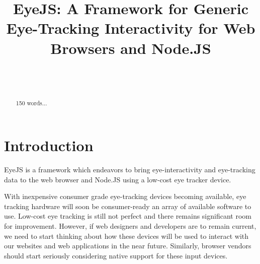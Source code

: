 \documentclass{sigchi}
\begin{document}
\title{EyeJS: A Framework for Generic Eye-Tracking Interactivity for Web Browsers and Node.JS}

\author{%
  \\
  \\
}

\maketitle



\begin{abstract}
  150 words...
\end{abstract}









\section{Introduction}
EyeJS is a framework which endeavors to bring eye-interactivity and
eye-tracking data to the web browser and Node.JS using a low-cost eye
tracker device. 

With inexpensive consumer grade eye-tracking devices becoming available, 
eye tracking hardware will soon be consumer-ready an array of available 
software to use. Low-cost eye tracking is still not perfect and there 
remains significant room for improvement. However, if web designers and 
developers are to remain current, we need to start thinking about how 
these devices will be used to interact with our websites and web 
applications in the near future. Similarly, browser vendors should start seriously considering native support for these input devices.
\end{document}
